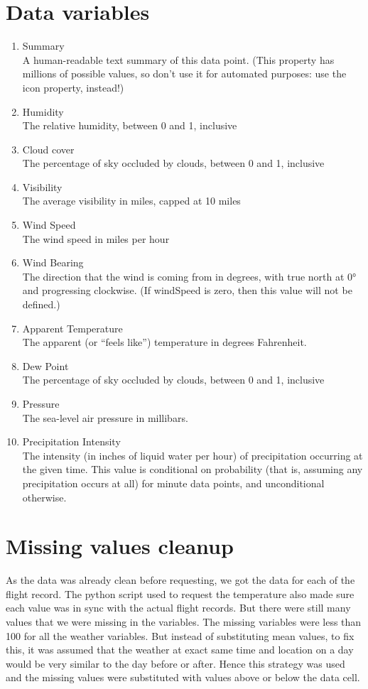 \section{Data variables}
\begin{enumerate}
    \item Summary
    \\A human-readable text summary of this data point. (This property has millions of possible values, so don’t use it for automated purposes: use the icon property, instead!)
    \item Humidity
    \\The relative humidity, between 0 and 1, inclusive
    \item Cloud cover
    \\The percentage of sky occluded by clouds, between 0 and 1, inclusive
    \item Visibility
    \\The average visibility in miles, capped at 10 miles
    \item Wind Speed
    \\The wind speed in miles per hour
    \item Wind Bearing
    \\The direction that the wind is coming from in degrees, with true north at 0° and progressing clockwise. (If windSpeed is zero, then this value will not be defined.)
    \item Apparent Temperature
    \\The apparent (or “feels like”) temperature in degrees Fahrenheit.
    \item Dew Point
    \\The percentage of sky occluded by clouds, between 0 and 1, inclusive
    \item Pressure
    \\The sea-level air pressure in millibars.
    \item Precipitation Intensity
    \\The intensity (in inches of liquid water per hour) of precipitation occurring at the given time. This value is conditional on probability (that is, assuming any precipitation occurs at all) for minute data points, and unconditional otherwise.
\end{enumerate}

\section{Missing values cleanup}
As the data was already clean before requesting, we got the data for each of the flight record. The python script used to request the temperature also made sure each value was in sync with the actual flight records.
But there were still many values that we were missing in the variables. The missing variables were less than 100 for all the weather variables. But instead of substituting mean values, to fix this, it was assumed that the weather at exact same time and location on a day would be very similar to the day before or after. Hence this strategy was used and the missing values were substituted with values above or below the data cell. 
